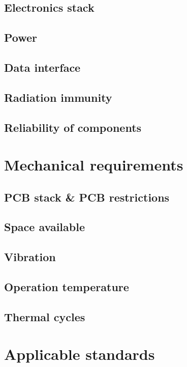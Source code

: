 \subsection{Electronics stack}
\subsection{Power}
\subsection{Data interface}
\subsection{Radiation immunity}
\subsection{Reliability of components}

\section{Mechanical requirements}
\subsection{PCB stack \& PCB restrictions}
\subsection{Space available}
\subsection{Vibration}
\subsection{Operation temperature}
\subsection{Thermal cycles}

\section{Applicable standards}